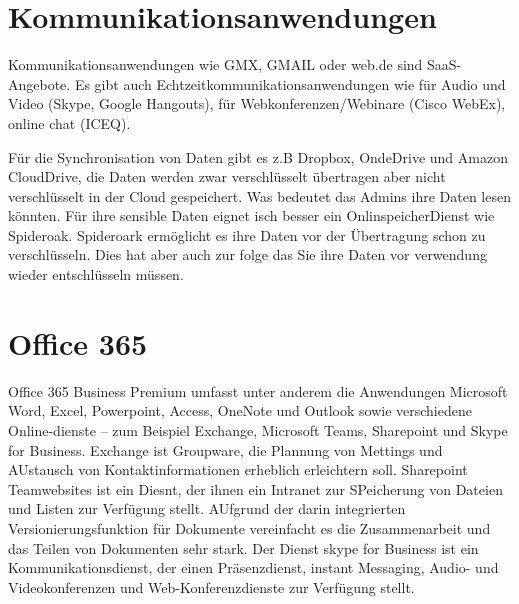 \documentclass[a4paper,10pt]{article}
\begin{document}
\section{Kommunikationsanwendungen}
Kommunikationsanwendungen wie GMX, GMAIL oder web.de sind SaaS-Angebote. Es gibt auch Echtzeitkommunikationsanwendungen wie für Audio und Video (Skype, Google Hangouts), für Webkonferenzen/Webinare (Cisco WebEx), online chat (ICEQ). \newline

\vspace{3mm}
Für die Synchronisation von Daten gibt es z.B Dropbox, OndeDrive und Amazon CloudDrive, die Daten werden zwar verschlüsselt übertragen aber nicht verschlüsselt in der Cloud gespeichert. Was bedeutet das Admins ihre Daten lesen könnten. Für ihre sensible Daten eignet isch besser ein OnlinspeicherDienst wie Spideroak. Spideroark ermöglicht es ihre Daten vor der Übertragung schon zu verschlüsseln. Dies hat aber auch zur folge das Sie ihre Daten vor verwendung wieder entschlüsseln müssen.

\section{Office 365}
Office 365 Business Premium umfasst unter anderem die Anwendungen Microsoft Word, Excel, Powerpoint, Access, OneNote und Outlook sowie verschiedene Online-dienste -- zum Beispiel Exchange, Microsoft Teams, Sharepoint und Skype for Business. Exchange ist Groupware, die Plannung von Mettings und AUstausch von Kontaktinformationen erheblich erleichtern soll. Sharepoint Teamwebsites ist ein Diesnt, der ihnen ein Intranet zur SPeicherung von Dateien und Listen zur Verfügung stellt. AUfgrund der darin integrierten Versionierungsfunktion für Dokumente vereinfacht es die Zusammenarbeit und das Teilen von Dokumenten sehr stark. Der Dienst skype for Business ist ein Kommunikationsdienst, der einen Präsenzdienst, instant Messaging, Audio- und Videokonferenzen und Web-Konferenzdienste zur Verfügung stellt. \newline
\end{document}
